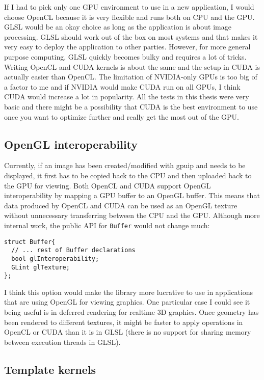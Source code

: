 If I had to pick only one GPU environment to use in a new application, I would choose OpenCL because it is very flexible and runs both on CPU and the GPU. GLSL would be an okay choice as long as the application is about image processing. GLSL should work out of the box on most systems and that makes it very easy to deploy the application to other parties. However, for more general purpose computing, GLSL quickly becomes bulky and requires a lot of tricks. Writing OpenCL and CUDA kernels is about the same and the setup in CUDA is actually easier than OpenCL. The limitation of NVIDIA-only GPUs is too big of a factor to me and if NVIDIA would make CUDA run on all GPUs, I think CUDA would increase a lot in popularity. All the tests in this thesis were very basic and there might be a possibility that CUDA is the best environment to use once you want to optimize further and really get the most out of the GPU.

\subsection{OpenGL interoperability}

Currently, if an image has been created/modified with gpuip and needs to be displayed, it first has to be copied back to the CPU and then uploaded back to the GPU for viewing. Both OpenCL and CUDA support OpenGL interoperability by mapping a GPU buffer to an OpenGL buffer. This means that data produced by OpenCL and CUDA can be used as an OpenGL texture without unnecessary transferring between the CPU and the GPU. Although more internal work, the public API for {\tt Buffer} would not change much:
\newline
\renewcommand{\lstlistingname}{Code}
\begin{lstlisting}[caption= gpuip OpenGL interoperability, label=glinter]
struct Buffer{
  // ... rest of Buffer declarations 
  bool glInteroperability;
  GLint glTexture;
};
\end{lstlisting}

I think this option would make the library more lucrative to use in applications that are using OpenGL for viewing graphics. One particular case I could see it being useful is in deferred rendering for realtime 3D graphics. Once geometry has been rendered to different textures, it might be faster to apply operations in OpenCL or CUDA than it is in GLSL (there is no support for sharing memory between execution threads in GLSL).

\subsection{Template kernels}

